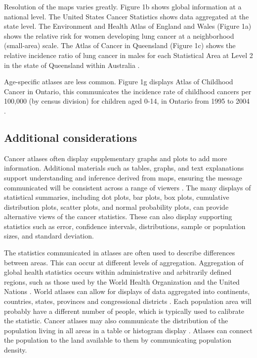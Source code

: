 \documentclass{monashthesis}
\begin{document}
Resolution of the maps varies greatly. Figure 1b shows global information at a national level. The United States Cancer Statistics \autocite{USInteractive} shows data aggregated at the state level. The Environment and Health Atlas of England and Wales \autocite{EnvEnglandWales2} (Figure 1a) shows the relative risk for women developing lung cancer at a neighborhood (small-area) scale. The Atlas of Cancer in Queensland (Figure 1c) shows the relative incidence ratio of lung cancer in males for each Statistical Area at Level 2 \autocite{abs2016} in the state of Queensland within Australia \autocite{QLDcancerAtlas}.

Age-specific atlases are less common. Figure 1g displays Atlas of Childhood Cancer in Ontario, this communicates the incidence rate of childhood cancers per 100,000 (by census division) for children aged 0-14, in Ontario from 1995 to 2004 \autocite{OntarioPediatric}.

\hypertarget{additional-considerations}{%
\subsection{Additional considerations}\label{additional-considerations}}

Cancer atlases often display supplementary graphs and plots to add more information. Additional materials such as tables, graphs, and text explanations support understanding and inference derived from maps, ensuring the message communicated will be consistent across a range of viewers \autocite{CPISACA}. The many displays of statistical summaries, including dot plots, bar plots, box plots, cumulative distribution plots, scatter plots, and normal probability plots, can provide alternative views of the cancer statistics. These can also display supporting statistics such as error, confidence intervals, distributions, sample or population sizes, and standard deviation.

The statistics communicated in atlases are often used to describe differences between areas. This can occur at different levels of aggregation. Aggregation of global health statistics occurs within administrative and arbitrarily defined regions, such as those used by the World Health Organization and the United Nations \autocite{IARC_3}. World atlases can allow for displays of data aggregated into continents, countries, states, provinces and congressional districts \autocite{USInteractive}. Each population area will probably have a different number of people, which is typically used to calibrate the statistic. Cancer atlases may also communicate the distribution of the population living in all areas in a table or histogram display \autocite{NICR_1}. Atlases can connect the population to the land available to them by communicating population density.
\end{document}
